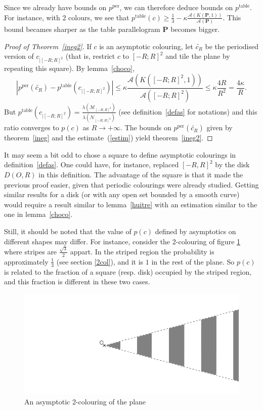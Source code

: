 \documentclass[a4paper,11pt]{article}
\theoremstyle{definition}
\theoremstyle{remark}
\newcommand{\M}{\mathcal{M}}
\newcommand{\N}{\mathcal{N}}
\newcommand{\pper}{p^{\mathrm{per}}}
\newcommand{\ptable}{p^{\mathrm{table}}}
\begin{document}
Since we already have bounds on $\pper$, we can therefore deduce bounds on $\ptable$.
For instance, with $2$ colours, we see that 
$\ptable(c) \geq \frac13 - \kappa \frac{\mathcal{A}(K(\mathbf{P},1))}{\mathcal{A}(\mathbf{P})}$. 
This bound becames sharper as the table parallelogram $\mathbf{P}$ becomes bigger.
\begin{proof}[Proof of Theorem~\ref{ineg2}]
If $c$ is an asymptotic colouring, let $\tilde{c_R}$ be the periodised version of $c_{|[-R;R]^2}$ (that is, restrict $c$ to $[-R;R]^2$ and tile the plane by repeating this square). By lemma~\ref{choco},
\begin{equation} \label{estim}
|\pper(\tilde{c_R}) - \ptable(c_{|[-R;R]^2}) | \leq \kappa \frac{\mathcal{A}(K([-R;R]^2,1))}{\mathcal{A}([-R;R]^2)} \leq \kappa \frac{4R}{R^2} = \frac{4\kappa}{R}.
\end{equation}
But $\ptable(c_{|[-R;R]^2}) = \frac{\lambda (\M_{[-R;R]^2})}{\lambda (\N_{[-R;R]^2})}$ (see definition~\ref{defas} for notations) and this ratio converges to $p(c)$ as $R\rightarrow +\infty$. The bounds on $\pper(\tilde{c_R})$ given by theorem~\ref{ineg} and the estimate~(\ref{estim}) yield theorem~\ref{ineg2}.
\end{proof}

It may seem a bit odd to chose a square to define asymptotic colourings in definition~\ref{defas}. One could have, for instance, replaced $[-R,R]^2$ by the disk $D(O,R)$ in this definition. The advantage of the square is that it made the previous proof easier, given that periodic colourings were already studied. Getting similar results for a disk (or with any open set bounded by a smooth curve) would require a result similar to lemma~\ref{huitre} with an estimation similar to the one in lemma~\ref{choco}.

Still, it should be noted that the value of $p(c)$ defined by asymptotics on different shapes may differ. For instance, consider the 2-colouring of figure \ref{contrex} where stripes are $\frac{\sqrt{3}}{2}$ appart. In the striped region the probability is approximately $\frac13$ (see section \ref{2col}), and it is $1$ in the rest of the plane. So $p(c)$ is related to the fraction of a square (resp. disk) occupied by the striped region, and this fraction is different in these two cases.

\begin{figure}[h]
\center
\includegraphics[scale=0.5]{contrex.png}
\caption{\label{contrex} An asymptotic 2-colouring of the plane}
\end{figure}
\end{document}
